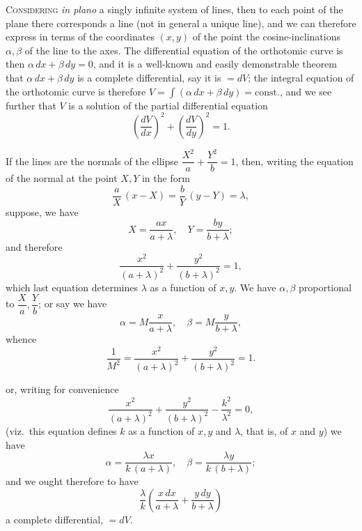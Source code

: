 \documentclass[11pt]{article}
\begin{document}
\textsc{Considering} \textit{in plano} a singly infinite system of lines, then to each point of the plane there corresponds a line (not in general a unique line), and we can therefore express in terms of the coordinates $(x, y)$ of the point the cosine-inclinations $\alpha, \beta$ of the line to the axes. The differential equation of the orthotomic curve is then $\alpha\, dx + \beta\, dy = 0$, and it is a well-known and easily demonstrable theorem that $\alpha\, dx + \beta\, dy$ is a complete differential, say it is $= dV$; the integral equation of the orthotomic curve is therefore $V = \displaystyle\int (\alpha\, dx + \beta\, dy) = \mathrm{const.}$, and we see further that $V$ is a solution of the partial differential equation
\[
\left(\frac{dV}{dx}\right)^{\!2} + \left(\frac{dV}{dy}\right)^{\!2} = 1.
\]

If the lines are the normals of the ellipse $\dfrac{X^2}{a} + \dfrac{Y^2}{b} = 1$, then, writing the equation of the normal at the point $X, Y$ in the form
\[
\frac{a}{X}\,(x - X) = \frac{b}{Y}\,(y - Y) = \lambda,
\]
suppose, we have
\[
X = \frac{ax}{a + \lambda},\quad Y = \frac{by}{b + \lambda};
\]
and therefore
\[
\frac{x^2}{(a + \lambda)^2} + \frac{y^2}{(b + \lambda)^2} = 1,
\]
which last equation determines $\lambda$ as a function of $x, y$. We have $\alpha, \beta$ proportional to $\dfrac{X}{a}, \dfrac{Y}{b}$; or say we have
\[
\alpha = M\frac{x}{a + \lambda},\quad \beta = M\frac{y}{b + \lambda},
\]
whence
\[
\frac{1}{M^2} = \frac{x^2}{(a + \lambda)^2} + \frac{y^2}{(b + \lambda)^2} = 1.
\]

or, writing for convenience
\[
\frac{x^2}{(a + \lambda)^2} + \frac{y^2}{(b + \lambda)^2} - \frac{k^2}{\lambda^2} = 0,
\]
(viz.\ this equation defines $k$ as a function of $x, y$ and $\lambda$, that is, of $x$ and $y$) we have
\[
\alpha = \frac{\lambda x}{k\,(a + \lambda)},\quad \beta = \frac{\lambda y}{k\,(b + \lambda)};
\]
and we ought therefore to have
\[
\frac{\lambda}{k}\!\left(\frac{x\, dx}{a + \lambda} + \frac{y\, dy}{b + \lambda}\right)
\]
a complete differential, $= dV$.
\end{document}
